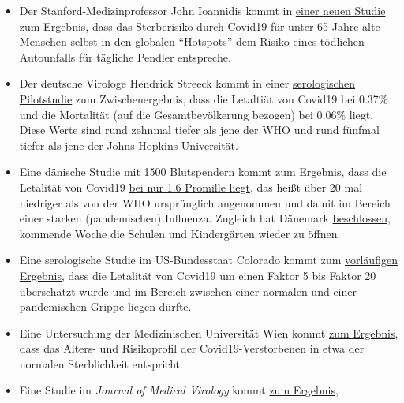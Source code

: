 \begin{itemize}
\tightlist
\item
  Der Stanford-Medizinprofessor John Ioannidis kommt in
  \href{https://www.medrxiv.org/content/10.1101/2020.04.05.20054361v1}{einer
  neuen Studie} zum Ergebnis, dass das Sterberisiko durch Covid19 für
  unter 65 Jahre alte Menschen selbst in den globalen ``Hotspots'' dem
  Risiko eines tödlichen Autounfalls für tägliche Pendler entspreche.
\item
  Der deutsche Virologe Hendrick Streeck kommt in einer
  \href{https://www.t-online.de/gesundheit/krankheiten-symptome/id_87680236/lockerung-der-corona-massnahmen-ergebnisse-der-heinsberg-studie-machen-hoffnung.html}{serologischen
  Pilotstudie} zum Zwischen­ergebnis, dass die Letaltiät von Covid19 bei
  0.37\% und die Mortalität (auf die Gesamtbevölkerung bezogen) bei
  0.06\% liegt. Diese Werte sind rund zehnmal tiefer als jene der WHO
  und rund fünfmal tiefer als jene der Johns Hopkins Universität.
\item
  Eine dänische Studie mit 1500 Blutspendern kommt zum Ergebnis, dass
  die Letalität von Covid19
  \href{https://www.dr.dk/nyheder/indland/doedelighed-skal-formentlig-taelles-i-promiller-danske-blodproever-kaster-nyt-lys}{bei
  nur 1.6 Promille liegt}, das heißt über 20 mal niedriger als von der
  WHO ursprünglich angenommen und damit im Bereich einer starken
  (pandemischen) Influenza. Zugleich hat Dänemark
  \href{https://www.thelocal.dk/20200406/denmark-to-reopen-schools-and-kindergartens-next-week}{beschlossen},
  kommende Woche die Schulen und Kindergärten wieder zu öffnen.
\item
  Eine serologische Studie im US-Bundesstaat Colorado kommt zum
  \href{https://reason.com/2020/04/08/mass-antibody-testing-in-this-rural-colorado-county-sheds-light-on-covid-19s-prevalence-and-lethality/}{vorläufigen
  Ergebnis}, dass die Letalität von Covid19 um einen Faktor 5 bis Faktor
  20 überschätzt wurde und im Bereich zwischen einer normalen und einer
  pandemischen Grippe liegen dürfte.
\item
  Eine Untersuchung der Medizinischen Universität Wien kommt
  \href{https://www.vienna.at/analyse-zeigt-covid-19-opferkurve-entspricht-normaler-mortalitaet/6581246}{zum
  Ergebnis}, dass das Alters- und Risikoprofil der Covid19-Verstorbenen
  in etwa der normalen Sterblichkeit entspricht.
\item
  Eine Studie im \emph{Journal of Medical Virology} kommt
  \href{https://www.ncbi.nlm.nih.gov/pubmed/32219885}{zum Ergebnis},

\end{itemize}

